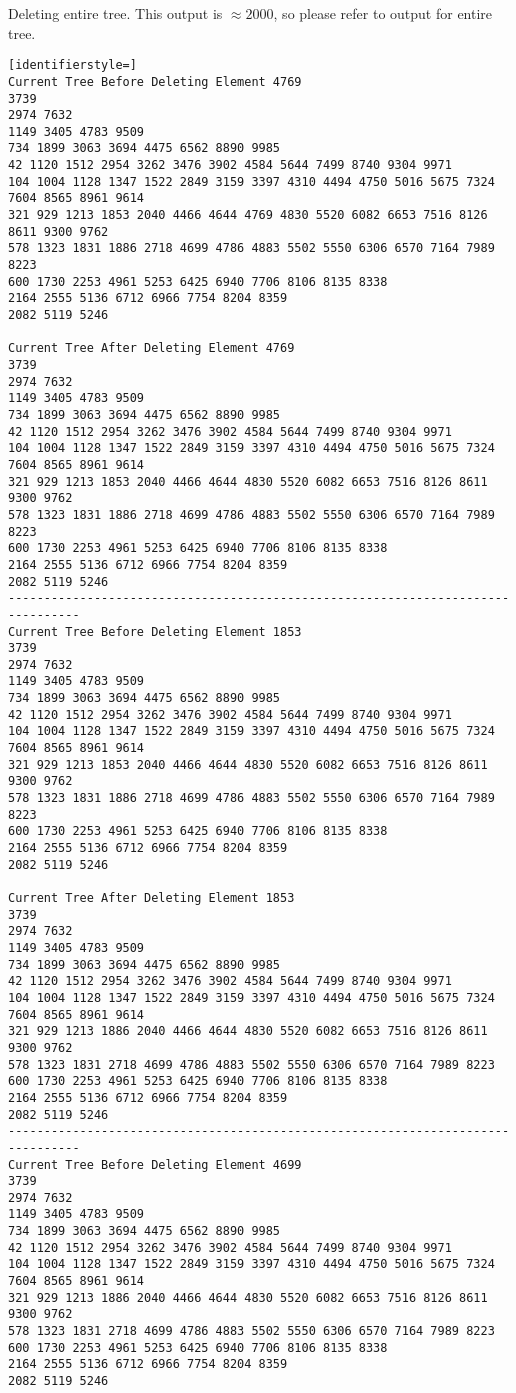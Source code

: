 \documentclass[12pt]{scrartcl}
\begin{document}
\subproblem{}
Deleting entire tree. This output is $\approx 2000$, so please refer to output for entire tree.

\begin{lstlisting}[identifierstyle=]
Current Tree Before Deleting Element 4769
3739
2974 7632
1149 3405 4783 9509
734 1899 3063 3694 4475 6562 8890 9985
42 1120 1512 2954 3262 3476 3902 4584 5644 7499 8740 9304 9971
104 1004 1128 1347 1522 2849 3159 3397 4310 4494 4750 5016 5675 7324 7604 8565 8961 9614
321 929 1213 1853 2040 4466 4644 4769 4830 5520 6082 6653 7516 8126 8611 9300 9762
578 1323 1831 1886 2718 4699 4786 4883 5502 5550 6306 6570 7164 7989 8223
600 1730 2253 4961 5253 6425 6940 7706 8106 8135 8338
2164 2555 5136 6712 6966 7754 8204 8359
2082 5119 5246

Current Tree After Deleting Element 4769
3739
2974 7632
1149 3405 4783 9509
734 1899 3063 3694 4475 6562 8890 9985
42 1120 1512 2954 3262 3476 3902 4584 5644 7499 8740 9304 9971
104 1004 1128 1347 1522 2849 3159 3397 4310 4494 4750 5016 5675 7324 7604 8565 8961 9614
321 929 1213 1853 2040 4466 4644 4830 5520 6082 6653 7516 8126 8611 9300 9762
578 1323 1831 1886 2718 4699 4786 4883 5502 5550 6306 6570 7164 7989 8223
600 1730 2253 4961 5253 6425 6940 7706 8106 8135 8338
2164 2555 5136 6712 6966 7754 8204 8359
2082 5119 5246
--------------------------------------------------------------------------------
Current Tree Before Deleting Element 1853
3739
2974 7632
1149 3405 4783 9509
734 1899 3063 3694 4475 6562 8890 9985
42 1120 1512 2954 3262 3476 3902 4584 5644 7499 8740 9304 9971
104 1004 1128 1347 1522 2849 3159 3397 4310 4494 4750 5016 5675 7324 7604 8565 8961 9614
321 929 1213 1853 2040 4466 4644 4830 5520 6082 6653 7516 8126 8611 9300 9762
578 1323 1831 1886 2718 4699 4786 4883 5502 5550 6306 6570 7164 7989 8223
600 1730 2253 4961 5253 6425 6940 7706 8106 8135 8338
2164 2555 5136 6712 6966 7754 8204 8359
2082 5119 5246

Current Tree After Deleting Element 1853
3739
2974 7632
1149 3405 4783 9509
734 1899 3063 3694 4475 6562 8890 9985
42 1120 1512 2954 3262 3476 3902 4584 5644 7499 8740 9304 9971
104 1004 1128 1347 1522 2849 3159 3397 4310 4494 4750 5016 5675 7324 7604 8565 8961 9614
321 929 1213 1886 2040 4466 4644 4830 5520 6082 6653 7516 8126 8611 9300 9762
578 1323 1831 2718 4699 4786 4883 5502 5550 6306 6570 7164 7989 8223
600 1730 2253 4961 5253 6425 6940 7706 8106 8135 8338
2164 2555 5136 6712 6966 7754 8204 8359
2082 5119 5246
--------------------------------------------------------------------------------
Current Tree Before Deleting Element 4699
3739
2974 7632
1149 3405 4783 9509
734 1899 3063 3694 4475 6562 8890 9985
42 1120 1512 2954 3262 3476 3902 4584 5644 7499 8740 9304 9971
104 1004 1128 1347 1522 2849 3159 3397 4310 4494 4750 5016 5675 7324 7604 8565 8961 9614
321 929 1213 1886 2040 4466 4644 4830 5520 6082 6653 7516 8126 8611 9300 9762
578 1323 1831 2718 4699 4786 4883 5502 5550 6306 6570 7164 7989 8223
600 1730 2253 4961 5253 6425 6940 7706 8106 8135 8338
2164 2555 5136 6712 6966 7754 8204 8359
2082 5119 5246


\end{lstlisting}
\end{document}
